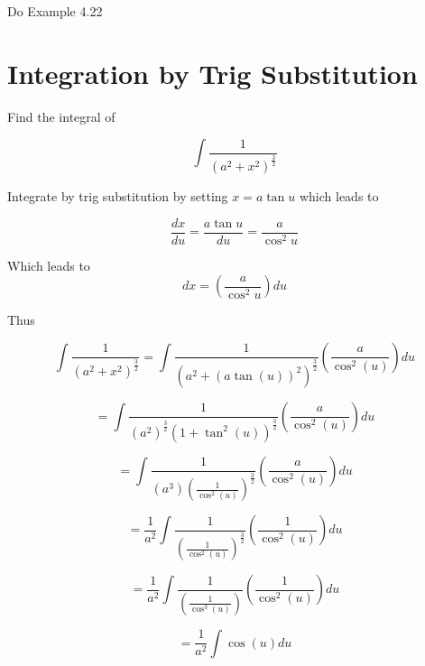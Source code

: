 \documentclass[14pt]{memoir}
\begin{document}
\begin{tcolorbox}
Do Example 4.22
\end{tcolorbox}
\appendix

\chapter{Integration by Trig Substitution}
\label{sec:trigsub}

Find the integral of 

\begin{equation}
\int \frac{1}{(a^2 + x^2)^{\frac{3}{2}}}
\end{equation}

Integrate by trig substitution by setting $x = a\tan{u}$ which leads to 

\begin{equation}
\frac{dx}{du} = \frac{a \tan{u}}{du} = \frac{a}{\cos^2{u}}
\end{equation}

Which leads to 
\begin{equation}
dx = ( \frac{a}{\cos^2{u}}) du 
\end{equation}

Thus

\begin{equation}
\int \frac{1}{(a^2 + x^2)^{\frac{3}{2}}} =  \int \frac{1}{(a^2 + (a\tan{(u)})^2)^{\frac{3}{2}}} ( \frac{a}{\cos^2{(u)}}) du
\end{equation}

\begin{equation}
=  \int \frac{1}{(a^2)^{\frac{3}{2}} (1 + \tan^2{(u)})^{\frac{3}{2}}} ( \frac{a}{\cos^2{(u)}}) du
\end{equation}

\begin{equation}
=  \int \frac{1}{(a^3)(\frac{1}{\cos^2(u)})^{\frac{3}{2}}} ( \frac{a}{\cos^2{(u)}}) du
\end{equation}

\begin{equation}
=  \frac{1}{a^2} \int \frac{1}{(\frac{1}{\cos^2(u)})^{\frac{3}{2}}} ( \frac{1}{\cos^2{(u)}}) du
\end{equation}

\begin{equation}
=  \frac{1}{a^2} \int \frac{1}{(\frac{1}{\cos^3(u)})} ( \frac{1}{\cos^2{(u)}}) du
\end{equation}

\begin{equation}
=  \frac{1}{a^2} \int \cos{(u)} du
\end{equation}
\end{document}
